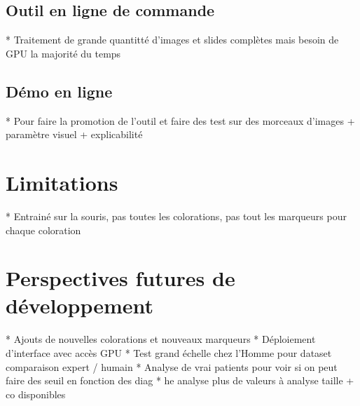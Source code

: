 \subsection{Outil en ligne de commande}
* Traitement de grande quantitté d'images et slides complètes mais besoin de GPU la majorité du temps
\subsection{Démo en ligne}
* Pour faire la promotion de l'outil et faire des test sur des morceaux d'images + paramètre visuel + explicabilité
\section{Limitations}
* Entrainé sur la souris, pas toutes les colorations, pas tout les marqueurs pour chaque coloration

\section{Perspectives futures de développement}
* Ajouts de nouvelles colorations et nouveaux marqueurs
* Déploiement d'interface avec accès GPU
* Test grand échelle chez l'Homme pour dataset comparaison expert / humain
* Analyse de vrai patients pour voir si on peut faire des seuil en fonction des diag
* he analyse plus de valeurs à analyse taille + co disponibles